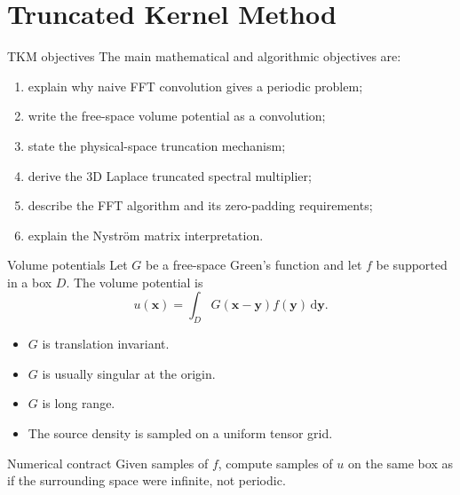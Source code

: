 \documentclass[aspectratio=169,11pt]{beamer}
\newcommand{\dd}{\,\mathrm d}
\newcommand{\x}{\bm{x}}
\newcommand{\y}{\bm{y}}
\begin{document}
\section{Truncated Kernel Method}

\begin{frame}{TKM objectives}
\small
The main mathematical and algorithmic objectives are:
\begin{enumerate}
  \item explain why naive FFT convolution gives a periodic problem;
  \item write the free-space volume potential as a convolution;
  \item state the physical-space truncation mechanism;
  \item derive the 3D Laplace truncated spectral multiplier;
  \item describe the FFT algorithm and its zero-padding requirements;
  \item explain the Nystr\"om matrix interpretation.
\end{enumerate}
\end{frame}

\begin{frame}{Volume potentials}
\small
Let $G$ be a free-space Green's function and let $f$ be supported in a box $D$.
The volume potential is
\[
  u(\x)=\int_D G(\x-\y)f(\y)\dd\y.
\]

\begin{itemize}
  \item $G$ is translation invariant.
  \item $G$ is usually singular at the origin.
  \item $G$ is long range.
  \item The source density is sampled on a uniform tensor grid.
\end{itemize}

\begin{block}{Numerical contract}
Given samples of $f$, compute samples of $u$ on the same box as if the
surrounding space were infinite, not periodic.
\end{block}
\end{frame}
\end{document}
